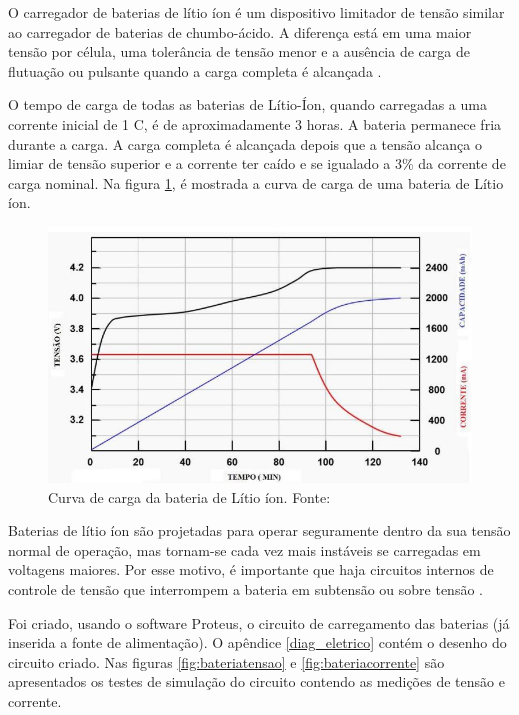 O carregador de baterias de lítio íon é um dispositivo limitador de tensão similar ao carregador de baterias de chumbo-ácido. A diferença está em uma maior tensão por célula, uma tolerância de tensão menor e a ausência de carga de flutuação ou pulsante quando a carga completa é alcançada \cite{bateria_litio}.

O tempo de carga de todas as baterias de Lítio-Íon, quando carregadas a uma corrente inicial de 1 C, é de aproximadamente 3 horas. A bateria permanece fria durante a carga. A carga completa é alcançada depois que a tensão alcança o limiar de tensão superior e a corrente ter caído e se igualado a 3\% da corrente de carga nominal. Na figura \ref{fig:curvacarga}, é mostrada a curva de carga de uma bateria de Lítio íon.

\begin{figure}[!h]
	\centering
		\includegraphics[keepaspectratio=true,scale=0.5]{figuras/Curva_carga.JPG}
	\caption{Curva de carga da bateria de Lítio íon. Fonte: \cite{bateria_litio}}
	\label{fig:curvacarga}
\end{figure}

Baterias de lítio íon são projetadas para operar seguramente dentro da sua tensão normal de operação, mas tornam-se cada vez mais instáveis se carregadas em voltagens maiores. Por esse motivo, é importante que haja circuitos internos de controle de tensão que interrompem a bateria em subtensão ou sobre tensão \cite{bateria_litio}.

Foi criado, usando o software Proteus, o circuito de carregamento das baterias (já inserida a fonte de alimentação). O apêndice \ref{diag_eletrico} contém o desenho do circuito criado. Nas figuras \ref{fig:bateriatensao} e \ref{fig:bateriacorrente} são apresentados os testes de simulação do circuito contendo as medições de tensão e corrente.

